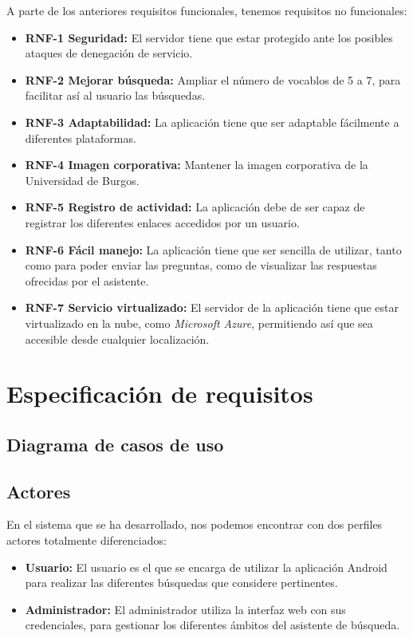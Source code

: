 A parte de los anteriores requisitos funcionales, tenemos requisitos no funcionales:

\begin{itemize}
	\tightlist
	\item 
	\textbf{RNF-1 Seguridad:} El servidor tiene que estar protegido ante los posibles ataques de denegación de servicio.
	\item 
	\textbf{RNF-2 Mejorar búsqueda:} Ampliar el número de vocablos de 5 a 7, para facilitar así al usuario las búsquedas.
	\item 
	\textbf{RNF-3 Adaptabilidad:} La aplicación tiene que ser adaptable fácilmente a diferentes plataformas.
	\item 
	\textbf{RNF-4 Imagen corporativa:} Mantener la imagen corporativa de la Universidad de Burgos.
	\item 
	\textbf{RNF-5 Registro de actividad:} La aplicación debe de ser capaz de registrar los diferentes enlaces accedidos por un usuario.
	\item 
	\textbf{RNF-6 Fácil manejo:} La aplicación tiene que ser sencilla de utilizar, tanto como para poder enviar las preguntas, como de visualizar las respuestas ofrecidas por el asistente. 
	\item 
	\textbf{RNF-7 Servicio virtualizado:} El servidor de la aplicación tiene que estar virtualizado en la nube, como \textit{Microsoft Azure}, permitiendo así que sea accesible desde cualquier localización.
\end{itemize}

\newpage

\section{Especificación de requisitos}

\subsection{Diagrama de casos de uso}


\subsection{Actores}

En el sistema que se ha desarrollado, nos podemos encontrar con dos perfiles actores totalmente diferenciados:

\begin{itemize}
	\item 
	\textbf{Usuario:} El usuario es el que se encarga de utilizar la aplicación Android para realizar las diferentes búsquedas que considere pertinentes.
	\item 
	\textbf{Administrador:} El administrador utiliza la interfaz web con sus credenciales, para gestionar los diferentes ámbitos del asistente de búsqueda.
\end{itemize}


